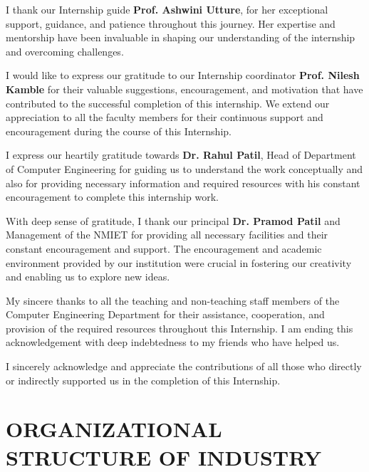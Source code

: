 \documentclass[12pt, a4paper, oneside]{report}
\begin{document}
I thank our Internship guide \textbf{Prof. Ashwini Utture}, for her exceptional support, 
guidance, and patience throughout this journey. Her expertise and mentorship have been 
invaluable in shaping our understanding of the internship and overcoming challenges.

I would like to express our gratitude to our Internship coordinator \textbf{Prof. Nilesh Kamble} 
for their valuable suggestions, encouragement, and motivation that have contributed to the 
successful completion of this internship. We extend our appreciation to all the faculty members 
for their continuous support and encouragement during the course of this Internship.

I express our heartily gratitude towards \textbf{Dr. Rahul Patil}, Head of Department of 
Computer Engineering for guiding us to understand the work conceptually and also for 
providing necessary information and required resources with his constant encouragement to 
complete this internship work.

With deep sense of gratitude, I thank our principal \textbf{Dr. Pramod Patil} and Management 
of the NMIET for providing all necessary facilities and their constant encouragement and 
support. The encouragement and academic environment provided by our institution were 
crucial in fostering our creativity and enabling us to explore new ideas.

My sincere thanks to all the teaching and non-teaching staff members of the Computer 
Engineering Department for their assistance, cooperation, and provision of the required 
resources throughout this Internship. I am ending this acknowledgement with deep 
indebtedness to my friends who have helped us.

I sincerely acknowledge and appreciate the contributions of all those who directly or 
indirectly supported us in the completion of this Internship.


\tableofcontents
\thispagestyle{fancy}


\chapter{ORGANIZATIONAL STRUCTURE OF INDUSTRY}
\end{document}
